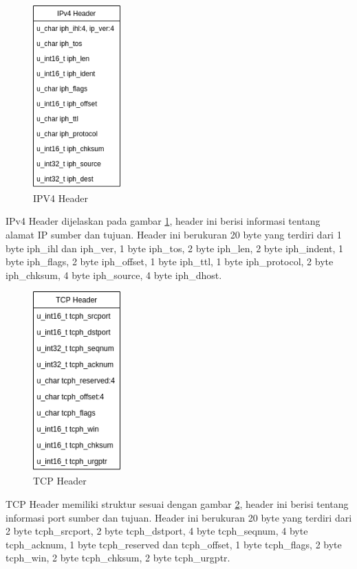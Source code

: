 \documentclass[./skripsi.tex]{subfiles}
\begin{document}
\begin{figure}%
    \centering
    \includegraphics[width=0.3\textwidth]{public/assets/img/IPV4Header.png}
    \caption{IPV4 Header}
    \label{fig:ipv4header}
\end{figure}
\par IPv4 Header dijelaskan pada gambar \ref{fig:ipv4header}, header ini berisi informasi tentang alamat IP sumber dan tujuan. Header ini berukuran 20 byte yang terdiri dari 1 byte iph\_ihl dan iph\_ver, 1 byte iph\_tos, 2 byte iph\_len, 2 byte iph\_indent, 1 byte iph\_flags, 2 byte iph\_offset, 1 byte iph\_ttl, 1 byte iph\_protocol, 2 byte iph\_chksum, 4 byte iph\_source, 4 byte iph\_dhost.
\begin{figure}%
    \centering
    \includegraphics[width=0.3\textwidth]{public/assets/img/TCPHeader.png}
    \caption{TCP Header}
    \label{fig:tcpheader}
\end{figure}
\par TCP Header memiliki struktur sesuai dengan gambar \ref{fig:tcpheader}, header ini berisi tentang informasi port sumber dan tujuan. Header ini berukuran 20 byte yang terdiri dari 2 byte tcph\_srcport, 2 byte tcph\_dstport, 4 byte tcph\_seqnum, 4 byte tcph\_acknum, 1 byte tcph\_reserved dan tcph\_offset, 1 byte tcph\_flags, 2 byte tcph\_win, 2 byte tcph\_chksum, 2 byte tcph\_urgptr.
\end{document}
